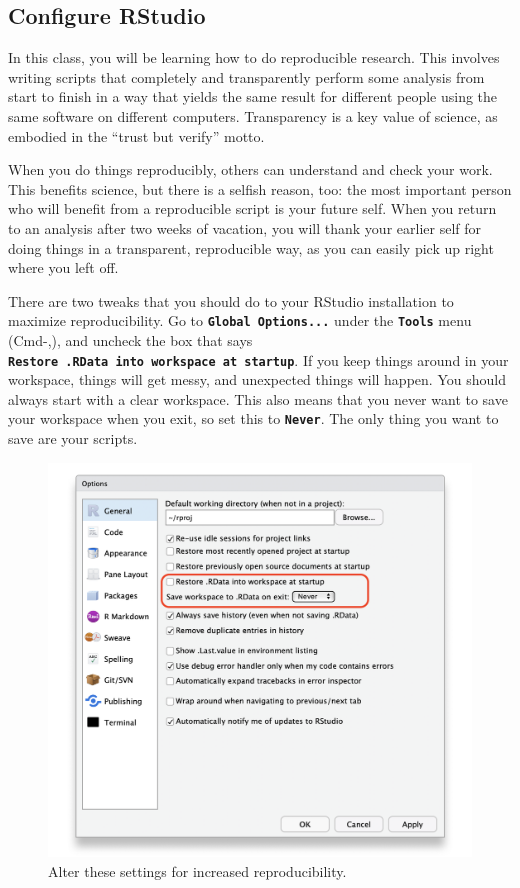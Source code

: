\documentclass[
  oneside]{book}
\begin{document}
\hypertarget{configure-rstudio}{%
\subsection{Configure RStudio}\label{configure-rstudio}}

In this class, you will be learning how to do reproducible research. This involves writing scripts that completely and transparently perform some analysis from start to finish in a way that yields the same result for different people using the same software on different computers. Transparency is a key value of science, as embodied in the ``trust but verify'' motto.

When you do things reproducibly, others can understand and check your work. This benefits science, but there is a selfish reason, too: the most important person who will benefit from a reproducible script is your future self. When you return to an analysis after two weeks of vacation, you will thank your earlier self for doing things in a transparent, reproducible way, as you can easily pick up right where you left off.

There are two tweaks that you should do to your RStudio installation to maximize reproducibility. Go to \textbf{\texttt{Global\ Options...}} under the \textbf{\texttt{Tools}} menu (Cmd-,), and uncheck the box that says \textbf{\texttt{Restore\ .RData\ into\ workspace\ at\ startup}}. If you keep things around in your workspace, things will get messy, and unexpected things will happen. You should always start with a clear workspace. This also means that you never want to save your workspace when you exit, so set this to \textbf{\texttt{Never}}. The only thing you want to save are your scripts.

\begin{figure}

{\centering \includegraphics[width=0.66\linewidth]{images/intro/repro} 

}

\caption{Alter these settings for increased reproducibility.}\label{fig:img-repro}
\end{figure}
\end{document}
